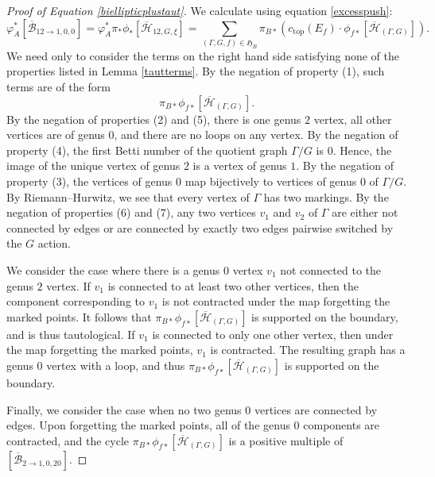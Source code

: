 \documentclass[12pt]{amsart}
\theoremstyle{definition}
\newcommand{\Bb}{\overline{\mathcal{B}}}
\newcommand{\Hb}{\overline{\mathcal{H}}}
\begin{document}
\begin{proof}[Proof of Equation \eqref{biellipticplustaut}]
We calculate using equation \eqref{excesspush}:
\[
\varphi_{A}^*[\Bb_{12\rightarrow 1,0,0}]=\varphi_A^*\pi_*\phi_*[\Hb_{12,G,\xi}]=\sum_{(\Gamma,G,f)\in \mathfrak{H}_B} \pi_{B*}\left(c_{\mathrm{top}}(E_f)\cdot \phi_{f*}[\Hb_{(\Gamma,G)}]\right).
\]
We need only to consider the terms on the right hand side satisfying none of the properties listed in Lemma \ref{tautterms}. By the negation of property (1), such terms are of the form
\[
\pi_{B*}\phi_{f*}[\Hb_{(\Gamma,G)}].
\]
By the negation of properties (2) and (5), there is one genus $2$ vertex, all other vertices are of genus $0$, and there are no loops on any vertex. 
By the negation of property (4), the first Betti number of the quotient graph $\Gamma/G$ is $0$. Hence, the image of the unique vertex of genus $2$ is a vertex of genus $1$. By the negation of property (3), the vertices of genus $0$ map bijectively to vertices of genus $0$ of $\Gamma/G$. By Riemann--Hurwitz, we see that every vertex of $\Gamma$ has two markings. By the negation of properties (6) and (7), any two vertices $v_1$ and $v_2$ of $\Gamma$ are either not connected by edges or are connected by exactly two edges pairwise switched by the $G$ action.


We consider the case where there is a genus $0$ vertex $v_1$ not connected to the genus $2$ vertex. If $v_1$ is connected to at least two other vertices, then the component corresponding to $v_1$ is not contracted under the map forgetting the marked points. It follows that $\pi_{B*}\phi_{f*}[\Hb_{(\Gamma,G)}]$ is supported on the boundary, and is thus tautological. If $v_1$ is connected to only one other vertex, then under the map forgetting the marked points, $v_1$ is contracted. The resulting graph has a genus $0$ vertex with a loop, and thus $\pi_{B*}\phi_{f*}[\Hb_{(\Gamma,G)}]$ is supported on the boundary. 

Finally, we consider the case when no two genus $0$ vertices are connected by edges. Upon forgetting the marked points, all of the genus $0$ components are contracted, and the cycle $\pi_{B*}\phi_{f*}[\Hb_{(\Gamma,G)}]$ is a positive multiple of $[\Bb_{2\rightarrow 1,0,20}]$. 

    
    
\end{proof}
\end{document}
